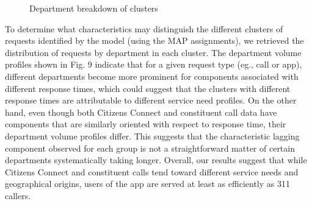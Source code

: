 \documentclass[twoside]{article}
\theoremstyle{theorem}
\theoremstyle{theorem}
\theoremstyle{theorem}
\theoremstyle{lemma}
\theoremstyle{definition}
\theoremstyle{example}
\begin{document}
\begin{figure}
\begin{center} \label{profiles}
\caption{Department breakdown of clusters}
\hskip1cm
\end{center}
\vskip -0.2in
\end{figure} 

To determine what characteristics may distinguish the different clusters of requests identified by the model (using the MAP assignments), we retrieved the distribution of requests by department in each cluster. The department volume profiles shown in Fig. 9 indicate that for a given request type (eg., call or app), different departments become more prominent for components associated with different response times, which could suggest that the clusters with different response times are attributable to different service need profiles. On the other hand, even though both Citizens Connect and constituent call data have components that are similarly oriented with respect to response time, their department volume profiles differ. This suggests that the characteristic lagging component observed for each group is not a straightforward matter of certain departments systematically taking longer.  Overall, our results suggest that while Citizens Connect and constituent calls tend toward different service needs and geographical origins, users of the app are served at least as efficiently as 311 callers.




\end{document}
